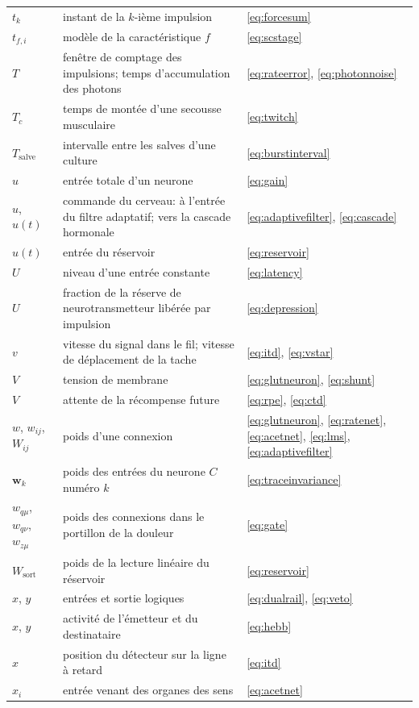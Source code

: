 \begin{center}
\begin{longtable}{>{\raggedright}p{2.0cm}>{\raggedright}p{9.6cm}>{\raggedright\arraybackslash}p{2.4cm}}
$t_k$ & instant de la $k$-ième impulsion & \eqref{eq:forcesum} \\
$t_{f,i}$ & modèle de la caractéristique $f$ & \eqref{eq:scstage} \\
$T$ & fenêtre de comptage des impulsions; temps d'accumulation des photons & \eqref{eq:rateerror}, \eqref{eq:photonnoise} \\
$T_c$ & temps de montée d'une secousse musculaire & \eqref{eq:twitch} \\
$T_{\text{salve}}$ & intervalle entre les salves d'une culture & \eqref{eq:burstinterval} \\
$u$ & entrée totale d'un neurone & \eqref{eq:gain} \\
$u$, $u(t)$ & commande du cerveau: à l'entrée du filtre adaptatif; vers la cascade hormonale & \eqref{eq:adaptivefilter}, \eqref{eq:cascade} \\
$u(t)$ & entrée du réservoir & \eqref{eq:reservoir} \\
$U$ & niveau d'une entrée constante & \eqref{eq:latency} \\
$U$ & fraction de la réserve de neurotransmetteur libérée par impulsion & \eqref{eq:depression} \\
$v$ & vitesse du signal dans le fil; vitesse de déplacement de la tache & \eqref{eq:itd}, \eqref{eq:vstar} \\
$V$ & tension de membrane & \eqref{eq:glutneuron}, \eqref{eq:shunt} \\
$V$ & attente de la récompense future & \eqref{eq:rpe}, \eqref{eq:ctd} \\
$w$, $w_{ij}$, $W_{ij}$ & poids d'une connexion & \eqref{eq:glutneuron}, \eqref{eq:ratenet}, \eqref{eq:acetnet}, \eqref{eq:lms}, \eqref{eq:adaptivefilter} \\
$\mathbf w_k$ & poids des entrées du neurone $C$ numéro $k$ & \eqref{eq:traceinvariance} \\
$w_{q\mu}$, $w_{q\nu}$, $w_{z\mu}$ & poids des connexions dans le portillon de la douleur & \eqref{eq:gate} \\
$W_{\text{sort}}$ & poids de la lecture linéaire du réservoir & \eqref{eq:reservoir} \\
$x$, $y$ & entrées et sortie logiques & \eqref{eq:dualrail}, \eqref{eq:veto} \\
$x$, $y$ & activité de l'émetteur et du destinataire & \eqref{eq:hebb} \\
$x$ & position du détecteur sur la ligne à retard & \eqref{eq:itd} \\
$x_i$ & entrée venant des organes des sens & \eqref{eq:acetnet} \\

\end{longtable}
\end{center}
